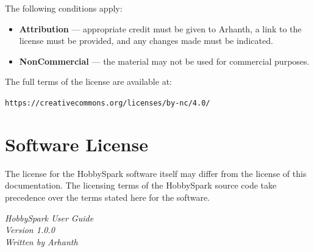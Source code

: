 \documentclass[11pt]{book}
\begin{document}
The following conditions apply:

\begin{itemize}
    \item \textbf{Attribution} --- appropriate credit must be given to
    Arhanth, a link to the license must be provided, and any changes made
    must be indicated.
    
    \item \textbf{NonCommercial} --- the material may not be used for
    commercial purposes.
\end{itemize}

The full terms of the license are available at:

\begin{center}
    \texttt{https://creativecommons.org/licenses/by-nc/4.0/}
\end{center}

\vspace{0.5cm}

\section*{Software License}

The license for the HobbySpark software itself may differ from the license
of this documentation. The licensing terms of the HobbySpark source code
take precedence over the terms stated here for the software.

\vfill

\begin{center}
    \textit{HobbySpark User Guide}\\
    \textit{Version 1.0.0}\\
    \textit{Written by Arhanth}
\end{center}
\newpage
	\mainmatter
	
	
	
	
	
	
	
	
	
\end{document}
